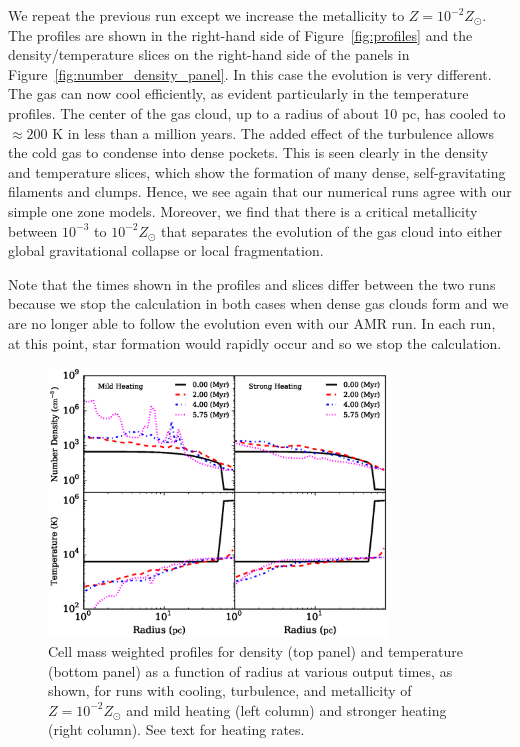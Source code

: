 \documentclass[useAMS,usenatbib]{mn2e}
\begin{document}
We repeat the previous run except we increase the metallicity to $Z=10^{-2}Z_\odot$.  The profiles are shown
in the right-hand side of Figure~\ref{fig:profiles} and the density/temperature slices on the right-hand side of the panels in Figure~\ref{fig:number_density_panel}.  In this case the evolution is very different.
The gas can now cool efficiently, as evident particularly in the temperature profiles.   The center
of the gas cloud, up to a radius of about 10 pc, has cooled to $\approx 200$ K in less than a million years. The added effect of the turbulence
allows the cold gas to condense into dense pockets.  This is seen clearly in the density and temperature slices, which show the formation of many dense, self-gravitating filaments and clumps.  
Hence, we see again that our numerical runs agree with our simple one zone models. Moreover, we find that there is a critical metallicity
between $10^{-3}$ to $10^{-2}Z_\odot$ that separates the evolution of the gas cloud into either global gravitational collapse or local fragmentation. 

Note that the times shown in the profiles and slices differ between the two runs because we stop the calculation in both cases when dense gas clouds form and we are no longer able to follow the evolution even with our AMR run.  In each run, at this point, star formation would rapidly occur and so we stop the calculation.

\begin{figure}
\begin{center}
\includegraphics[width=9.0cm]{Images/profile_heating}
\end{center}
\caption{\label{fig:profiles_heating} Cell mass weighted profiles for 
density (top panel) and temperature (bottom panel) as a function of radius at various 
output times, as shown, for runs with cooling, turbulence, and metallicity of $Z=10^{-2}Z_\odot$
and mild heating (left column) and stronger heating (right column).  See text for heating rates.}
\end{figure}
\end{document}
